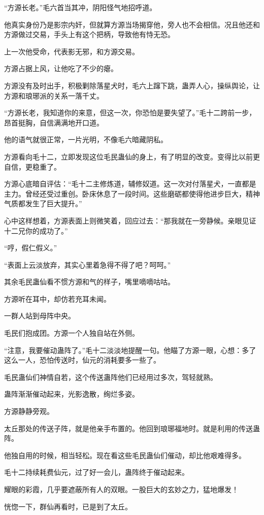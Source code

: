 \begin{this_body}
“方源长老。”毛六首当其冲，阴阳怪气地招呼道。

他真实身份乃是影宗内奸，但就算方源当场揭穿他，旁人也不会相信。况且他还和方源做过交易，手头上有这个把柄，导致他有恃无恐。

上一次他受命，代表影无邪，和方源交易。

方源占据上风，让他吃了不少的瘪。

方源没有及时出手，积极剿除落星犬时，毛六上蹿下跳，蛊弄人心，操纵舆论，让方源和琅琊派的关系一落千丈。

“方源长老，我知道你的来意，但这一次，你恐怕是要失望了。”毛十二跨前一步，昂首挺胸，自信满满地开口道。

他的语气就很正常，一片光明，不像毛六暗藏阴私。

方源看向毛十二，立即发现这位毛民蛊仙的身上，有了明显的改变。变得比以前更自信，更稳重了。

方源心底暗自评估：“毛十二主修炼道，辅修奴道。这一次对付落星犬，一直都是主力。曾经还受过重创。卧床休息了一段时间。这些磨砺都使得他进步巨大，精神气质都发生了巨大提升。”

心中这样想着，方源表面上则微笑着，回应过去：“那我就在一旁静候。亲眼见证十二兄你的成功了。”

“哼，假仁假义。”

“表面上云淡放弃，其实心里着急得不得了吧？呵呵。”

其余毛民蛊仙看不惯方源和气的样子，嘴里嘀嘀咕咕。

方源听在耳中，却仿若充耳未闻。

一群人站到母阵中央。

毛民们抱成团。方源一个人独自站在外侧。

“注意，我要催动蛊阵了。”毛十二淡淡地提醒一句。他瞄了方源一眼，心想：多了这么一人，恐怕传送时，仙元的消耗要多一些了。

毛民蛊仙们神情自若，这个传送蛊阵他们已经用过多次，驾轻就熟。

蛊阵渐渐催动起来，光影逸散，绚烂多姿。

方源静静旁观。

太丘那处的传送子阵，就是他亲手布置的。他回到琅琊福地时。就是利用的传送蛊阵。

他独自用的时候，相当轻松。现在看这些毛民蛊仙们催动，却比他艰难得多。

毛十二持续耗费仙元，过了好一会儿，蛊阵终于催动起来。

耀眼的彩霞，几乎要遮蔽所有人的双眼。一股巨大的玄妙之力，猛地爆发！

恍惚一下，群仙再看时，已是到了太丘。


\end{this_body}
